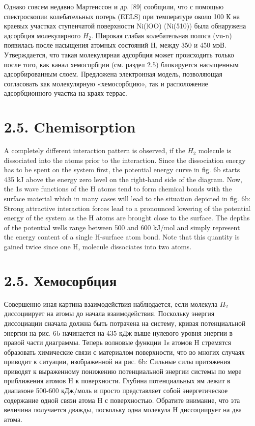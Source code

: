 \documentclass[11pt]{article}
\begin{document}
Однако совсем недавно Мартенссон и др. {[}89{]} сообщили, что с помощью
спектроскопии колебательных потерь (EELS) при температуре около 100 К на
краевых участках ступенчатой поверхности Ni(lOO) (Ni(510)) была
обнаружена адсорбция молекулярного \(H_2\). Широкая слабая колебательная
полоса (vu-n) появилась после насыщения атомных состояний H, между 350 и
450 мэВ. Утверждается, что такая молекулярная адсорбция может
происходить только после того, как канал хемосорбции (см. раздел 2.5)
блокируется насыщенным адсорбированным слоем. Предложена электронная
модель, позволяющая согласовать как молекулярную «хемосорбцию», так и
расположение адсорбционного участка на краях террас.

\section{2.5. Chemisorption}\label{chemisorption}

A completely different interaction pattern is observed, if the \(H_2\)
molecule is dissociated into the atoms prior to the interaction. Since
the dissociation energy has to be spent on the system first, the
potential energy curve in fig. 6b starts 435 kJ above the energy zero
level on the right-hand side of the diagram. Now, the 1s wave functions
of the H atoms tend to form chemical bonds with the surface material
which in many cases will lead to the situation depicted in fig. 6b:
Strong attractive interaction forces lead to a pronounced lowering of
the potential energy of the system as the H atoms are brought close to
the surface. The depths of the potential wells range between 500 and 600
kJ/mol and simply represent the energy content of a single H-surface
atom bond. Note that this quantity is gained twice since one H, molecule
dissociates into two atoms.

\section{2.5.
Хемосорбция}\label{ux445ux435ux43cux43eux441ux43eux440ux431ux446ux438ux44f}

Совершенно иная картина взаимодействия наблюдается, если молекула
\(H_2\) диссоциирует на атомы до начала взаимодействия. Поскольку
энергия диссоциации сначала должна быть потрачена на систему, кривая
потенциальной энергии на рис. 6b начинается на 435 кДж выше нулевого
уровня энергии в правой части диаграммы. Теперь волновые функции 1s
атомов H стремятся образовать химические связи с материалом поверхности,
что во многих случаях приводит к ситуации, изображенной на рис. 6b:
Сильные силы притяжения приводят к выраженному понижению потенциальной
энергии системы по мере приближения атомов H к поверхности. Глубина
потенциальных ям лежит в диапазоне 500-600 кДж/моль и просто
представляет собой энергетическое содержание одной связи атома H с
поверхностью. Обратите внимание, что эта величина получается дважды,
поскольку одна молекула H диссоциирует на два атома.
\end{document}
